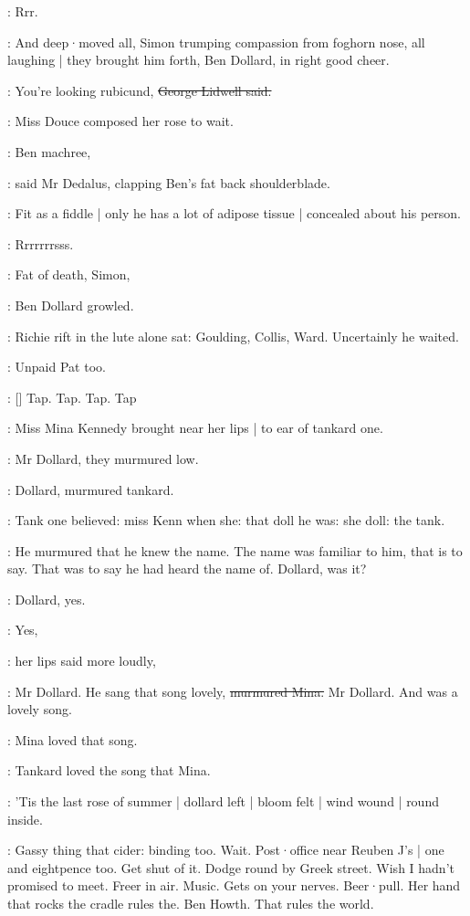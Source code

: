 :
Rrr.

:
And deep·moved all,
Simon trumping compassion from foghorn nose,
all laughing |
they brought him forth,
Ben Dollard,
in right good cheer.

\lidwell:
You're looking rubicund,
\sout{George Lidwell said.}

:
Miss Douce composed her rose to wait.

\simon:
Ben machree,

:
said Mr Dedalus,
clapping Ben's fat back shoulderblade.

\simon:
Fit as a fiddle |
only he has a lot of adipose tissue |
concealed about his person.

:
Rrrrrrrsss.

\dollard:
Fat of death,
Simon,

:
Ben Dollard growled.

:
Richie rift in the lute alone sat:
Goulding,
Collis,
Ward.
Uncertainly he waited.

:
Unpaid Pat too.

\stripling:
[]
Tap.
Tap.
Tap.
Tap

:
Miss Mina Kennedy brought near her lips |
to ear of tankard one.

:
Mr Dollard,
they murmured low.

:
Dollard,
murmured tankard.

:
Tank one believed:
miss Kenn when she:
that doll he was:
she doll:
the tank.

:
He murmured that he knew the name.
The name was familiar to him,
that is to say.
That was to say he had heard the name of.
Dollard,
was it?

:
Dollard,
yes.

\MissK:
Yes,

:
her lips said more loudly,

\MissK:
Mr Dollard.
He sang that song lovely,
\sout{murmured Mina.}
Mr Dollard.
And  was a lovely song.

:
Mina loved that song.

:
Tankard loved the song that Mina.

:
'Tis the last rose of summer |
dollard left |
bloom felt |
wind wound |
round inside.

\BloomInt:
Gassy thing that cider:
binding too.
Wait.
Post·office near Reuben J's |
one and eightpence too.
Get shut of it.
Dodge round by Greek street.
Wish I hadn't promised to meet.
Freer in air.
Music.
Gets on your nerves.
Beer·pull.
Her hand that rocks the cradle rules the.
Ben Howth.
That rules
the world.

